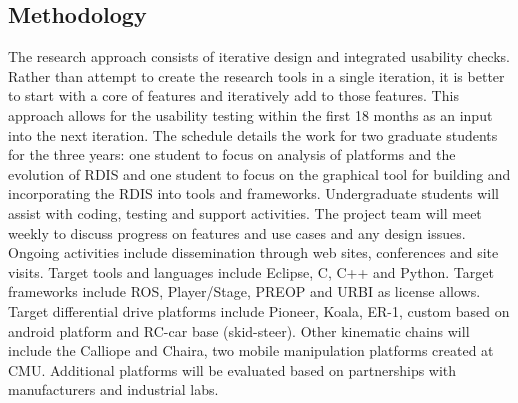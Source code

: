 \subsection{Methodology}
The research approach consists of iterative design and integrated usability checks.  Rather than attempt to create the research tools in a single iteration, it is better to start with a core of features and iteratively add to those features. This approach allows for the usability testing within the first 18 months as an input into the next iteration.  The schedule details the work for two graduate students for the three years: one student to focus on analysis of platforms and the evolution of RDIS and one student to focus on the graphical tool for building and incorporating the RDIS into tools and frameworks.  Undergraduate students will assist with coding, testing and support activities.  The project team will meet weekly to discuss progress on features and use cases and any design issues.  Ongoing activities include dissemination through web sites, conferences and site visits.    Target tools and languages include Eclipse, C, C++ and Python.  Target frameworks include ROS, Player/Stage, PREOP and URBI as license allows.  Target differential drive platforms include Pioneer, Koala, ER-1, custom based on android platform and RC-car base (skid-steer).  Other kinematic chains will include the Calliope and Chaira, two mobile manipulation platforms created at CMU.  Additional platforms will be evaluated based on partnerships with manufacturers and industrial labs.  

